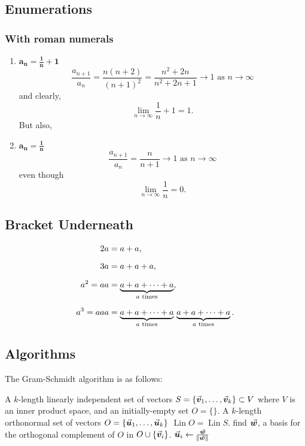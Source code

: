 \documentclass[MathsNotesBase.tex]{subfiles}
\begin{document}
	\subsection{Enumerations}
	\subsubsection{With roman numerals}
	\begin{enumerate}[label=(\roman*)]
		\item{${\bm{ a_n = \frac{1}{n} + 1 }}$}
		\[ \frac{a_{n+1}}{a_n} = \frac{n(n+2)}{(n+1)^2} =\frac{n^2 + 2n}{n^2 + 2n + 1} \to 1 \text{ as } n \to \infty \]
		and clearly,
		\[ \lim_{n \to \infty} \frac{1}{n} + 1 = 1. \]
		But also,
		\item{${\bm{ a_n = \frac{1}{n} }}$}
		\[  \frac{a_{n+1}}{a_n} = \frac{n}{n+1} \to 1 \text{ as } n \to \infty \]
		even though
		\[ \lim_{n \to \infty} \frac{1}{n} = 0. \]
	\end{enumerate}

	\subsection{Bracket Underneath}
	\[\begin{aligned}
		2a &= a + a, \nn
		3a &= a + a + a, \nn
		a^2 = aa &= \underbrace{a + a + \cdots + a}_{a \text{ times}}, \nn
		a^3 = aaa &= \underbrace{a + a + \cdots + a}_{a \text{ times}} \, \underbrace{a + a + \cdots + a}_{a \text{ times}}.
	\end{aligned}\]

	
	\subsection{Algorithms}
	The Gram-Schmidt algorithm is as follows:
	\begin{algorithm}
		\begin{algorithmic}
			\REQUIRE A $k$-length linearly independent set of vectors ${ S = \{\vec{\bm{v}}_1,\dots,\vec{\bm{v}}_k\} \subset V }$ where $V$ is an inner product space, and an initially-empty set ${ O = \{\} }$.
			\ENSURE A $k$-length orthonormal set of vectors ${ O = \{\vec{\bm{u}}_1, \dots, \vec{\bm{u}}_k \} }$ \suchthat ${ \operatorname{Lin} O = \operatorname{Lin} S }$.
			\STATE %
			\STATE find $\vec{\bm{w}}$, a basis for the orthogonal complement of $O$ in ${ O \cup \{\vec{\bm{v}}_i\} }$.
			\STATE ${ \vec{\bm{u}}_i \leftarrow \frac{\vec{\bm{w}}}{\norm{\vec{\bm{w}}}} }$
			\ENDFOR 
		\end{algorithmic}	
	\end{algorithm}
	
\end{document}
